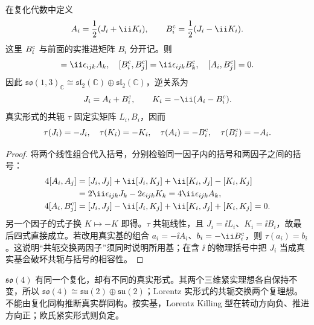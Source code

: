 \begin{theorem}[复化与真实形式]
在复化代数中定义
\begin{equation}
 A_i=\frac12(J_i+\ii K_i),\qquad B_i^{\rm c}=\frac12(J_i-\ii K_i).
 \label{eq:complex-rotation-boost}
\end{equation}
这里 $B_i^{\rm c}$ 与前面的实推进矩阵 $B_i$ 分开记。则
\begin{equation}
 [A_i,A_j]=\ii\epsilon_{ijk}A_k,\quad
 [B_i^{\rm c},B_j^{\rm c}]=\ii\epsilon_{ijk}B_k^{\rm c},\quad
 [A_i,B_j^{\rm c}]=0.
 \label{eq:so31-complex-decomposition}
\end{equation}
因此 $\mathfrak{so}(1,3)_{\mathbb C}\cong\mathfrak{sl}_2(\mathbb C)\oplus\mathfrak{sl}_2(\mathbb C)$，逆关系为
\begin{equation}
 J_i=A_i+B_i^{\rm c},\qquad K_i=-\ii(A_i-B_i^{\rm c}).
 \label{eq:inverse-complexification}
\end{equation}
真实形式的共轭 $\tau$ 固定实矩阵 $L_i,B_i$，因而
\begin{equation}
 \tau(J_i)=-J_i,\quad \tau(K_i)=-K_i,\quad
 \tau(A_i)=-B_i^{\rm c},\quad \tau(B_i^{\rm c})=-A_i.
 \label{eq:real-form-conjugation}
\end{equation}
\end{theorem}
\begin{proof}
将两个线性组合代入括号，分别检验同一因子内的括号和两因子之间的括号：
\begin{align*}
 4[A_i,A_j]&=[J_i,J_j]+\ii[J_i,K_j]+\ii[K_i,J_j]-[K_i,K_j]\\
 &=2\ii\epsilon_{ijk}J_k-2\epsilon_{ijk}K_k=4\ii\epsilon_{ijk}A_k,\\
 4[A_i,B_j^{\rm c}]&=[J_i,J_j]-\ii[J_i,K_j]+\ii[K_i,J_j]+[K_i,K_j]=0.
\end{align*}
另一个因子的式子换 $K\mapsto-K$ 即得。$\tau$ 共轭线性，且 $J_i=\ii L_i$、$K_i=\ii B_i$，故最后四式直接成立。若改用真实基的组合 $a_i=-\ii A_i$、$b_i=-\ii B_i^{\rm c}$，则 $\tau(a_i)=b_i$。这说明“共轭交换两因子”须同时说明所用基；在含 $\ii$ 的物理括号中把 $J_i$ 当成真实基会破坏共轭与括号的相容性。
\end{proof}

\begin{note}[与欧氏四维旋转的比较]
$\mathfrak{so}(4)$ 有同一个复化，却有不同的真实形式。其两个三维紧实理想各自保持不变，所以 $\mathfrak{so}(4)\cong\mathfrak{su}(2)\oplus\mathfrak{su}(2)$；Lorentz 实形式的共轭交换两个复理想。不能由复化同构推断真实群同构。按实基，Lorentz Killing 型在转动方向负、推进方向正；欧氏紧实形式则负定。
\end{note}

